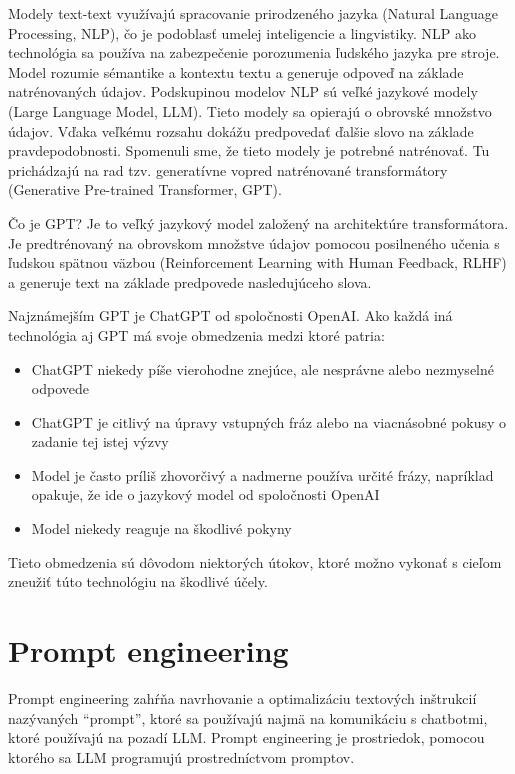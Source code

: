 Modely text-text využívajú spracovanie prirodzeného jazyka (Natural Language Processing, NLP), čo je podoblasť umelej inteligencie a lingvistiky. NLP ako technológia sa používa na zabezpečenie porozumenia ľudského jazyka pre stroje. Model rozumie sémantike a kontextu textu a generuje odpoveď na základe natrénovaných údajov. Podskupinou modelov NLP sú veľké jazykové modely (Large Language Model, LLM). Tieto modely sa opierajú o obrovské množstvo údajov. Vďaka veľkému rozsahu dokážu predpovedať ďalšie slovo na základe pravdepodobnosti. Spomenuli sme, že tieto modely je potrebné natrénovať. Tu prichádzajú na rad tzv. generatívne vopred natrénované transformátory (Generative Pre-trained Transformer, GPT).

Čo je GPT? Je to veľký jazykový model založený na architektúre transformátora. Je predtrénovaný na obrovskom množstve údajov pomocou posilneného učenia s ľudskou spätnou väzbou (Reinforcement Learning with Human Feedback, RLHF) a generuje text na základe predpovede nasledujúceho slova.

Najznámejším GPT je ChatGPT od spoločnosti OpenAI. Ako každá iná technológia aj GPT má svoje obmedzenia medzi ktoré patria:

\begin{itemize}
    \item ChatGPT niekedy píše vierohodne znejúce, ale nesprávne alebo nezmyselné odpovede
    \item ChatGPT je citlivý na úpravy vstupných fráz alebo na viacnásobné pokusy o zadanie tej istej výzvy
    \item Model je často príliš zhovorčivý a nadmerne používa určité frázy, napríklad opakuje, že ide o jazykový model od spoločnosti OpenAI
    \item Model niekedy reaguje na škodlivé pokyny
\end{itemize}

Tieto obmedzenia sú dôvodom niektorých útokov, ktoré možno vykonať s cieľom zneužiť túto technológiu na škodlivé účely.

\section*{Prompt engineering \label{sec:prompt_engineering_resume}}

Prompt engineering zahŕňa navrhovanie a optimalizáciu textových inštrukcií nazývaných ``prompt'', ktoré sa používajú najmä na komunikáciu s chatbotmi, ktoré používajú na pozadí LLM. Prompt engineering je prostriedok, pomocou ktorého sa LLM programujú prostredníctvom promptov.

